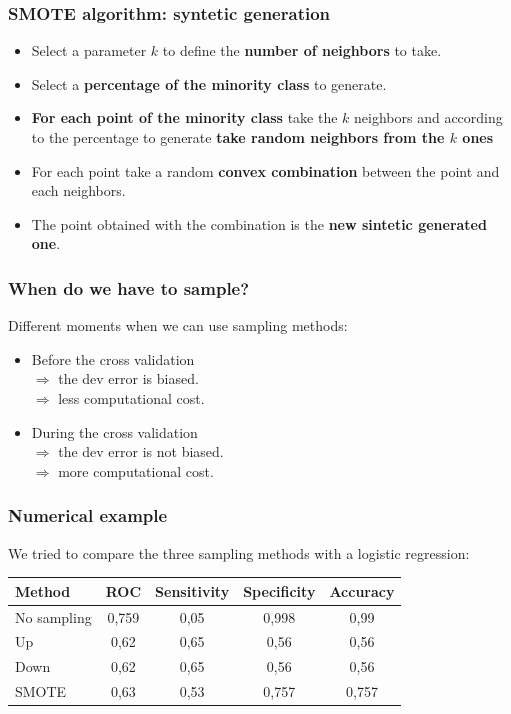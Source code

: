 \documentclass[9pt]{beamer}
\begin{document}
\begin{frame}
\frametitle{SMOTE algorithm: syntetic generation}
\begin{itemize}
\item<1->  Select a parameter $k$ to define the \textbf{number of neighbors} to take.
\item<2->  Select a \textbf{percentage of the minority class} to generate.
\item<3->  \textbf{For each point of the minority class} take the $k$ neighbors and according to the percentage to generate \textbf{take random neighbors from the $k$ ones}
\item<4->  For each point take a random \textbf{convex combination} between the point and each neighbors.
\item<5->  The point obtained with the combination is the \textbf{new sintetic generated one}.
\end{itemize}
\end{frame}

\begin{frame}
\frametitle{When do we have to sample?}
Different moments when we can use sampling methods:
\begin{itemize}
\item<1->  Before the cross validation\\
$\Rightarrow$ the dev error is biased.\\
$ \Rightarrow$ less computational cost.
\item<2->  During the cross validation\\
$\Rightarrow$ the dev error is not biased.\\
$\Rightarrow$ more computational cost.
\end{itemize}
\end{frame}

\begin{frame}
\frametitle{Numerical example}
We tried to compare the three sampling methods with a logistic regression:
\begin{table}
\begin{tabular}{l | c | c | c | c }
Method & ROC  & Sensitivity & Specificity & Accuracy\\
\hline \hline
No sampling & 0,759 & 0,05 & 0,998 & 0,99 \\
Up & 0,62 & 0,65 & 0,56 & 0,56 \\
Down & 0,62 & 0,65 & 0,56 & 0,56 \\
SMOTE & 0,63 & 0,53 & 0,757 & 0,757\\ 
\end{tabular}
\end{table}
\end{frame}
\end{document}
